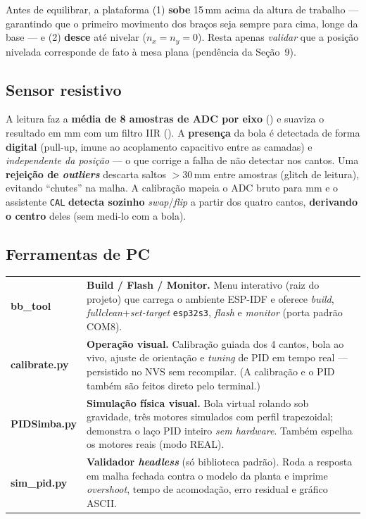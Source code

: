 \documentclass[11pt,a4paper,oneside]{article}
\newcommand{\rowstyle}{\rowcolor{rowgray}}
\begin{document}
\begin{infobox}
Antes de equilibrar, a plataforma (1) \textbf{sobe} 15\,mm acima da altura de
trabalho — garantindo que o primeiro movimento dos braços seja sempre para cima,
longe da base — e (2) \textbf{desce} até nivelar ($n_x=n_y=0$). Resta apenas
\emph{validar} que a posição nivelada corresponde de fato à mesa plana
(pendência da Seção~9).
\end{infobox}

\subsection{Sensor resistivo}

A leitura faz a \textbf{média de 8 amostras de ADC por eixo}
() e suaviza o resultado em mm com um filtro IIR
(). A \textbf{presença} da bola é detectada de forma
\textbf{digital} (pull-up, imune ao acoplamento capacitivo entre as camadas) e
\emph{independente da posição} — o que corrige a falha de não detectar nos cantos.
Uma \textbf{rejeição de \emph{outliers}} descarta saltos $>30$\,mm entre amostras
(glitch de leitura), evitando ``chutes'' na malha. A calibração mapeia o ADC bruto
para mm e o assistente \texttt{CAL} \textbf{detecta sozinho} \emph{swap}/\emph{flip}
a partir dos quatro cantos, \textbf{derivando o centro} deles (sem medi-lo com a bola).

\subsection{Ferramentas de PC}

\begin{center}
\small
\renewcommand{\arraystretch}{1.3}
\begin{tabularx}{\textwidth}{>{\ttfamily\bfseries\color{secondary}}l >{\RaggedRight\arraybackslash}X}
\toprule
bb\_tool & \textbf{Build / Flash / Monitor.} Menu interativo (raiz do projeto) que
carrega o ambiente ESP-IDF e oferece \emph{build}, \emph{fullclean}+\emph{set-target}
\texttt{esp32s3}, \emph{flash} e \emph{monitor} (porta padrão COM8). \\
\rowstyle calibrate.py & \textbf{Operação visual.} Calibração guiada dos 4 cantos,
bola ao vivo, ajuste de orientação e \emph{tuning} de PID em tempo real — persistido
no NVS sem recompilar. (A calibração e o PID também são feitos direto pelo terminal.) \\
PIDSimba.py & \textbf{Simulação física visual.} Bola virtual rolando sob
gravidade, três motores simulados com perfil trapezoidal; demonstra o laço PID
inteiro \emph{sem hardware}. Também espelha os motores reais (modo REAL). \\
\rowstyle sim\_pid.py & \textbf{Validador \emph{headless}} (só biblioteca padrão).
Roda a resposta em malha fechada contra o modelo da planta e imprime \emph{overshoot},
tempo de acomodação, erro residual e gráfico ASCII. \\
\bottomrule
\end{tabularx}
\end{center}
\end{document}
